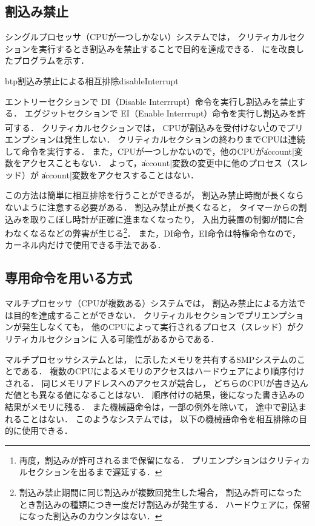 \subsection{割込み禁止}
\label{disableInterrupt}
シングルプロセッサ（CPUが一つしかない）システムでは，
クリティカルセクションを実行するとき割込みを禁止することで目的を達成できる．
にを改良したプログラムを示す．

\begin{myfig}{btp}{割込み禁止による相互排除}{disableInterrupt}
  
\end{myfig}

エントリーセクションで
DI（Disable Interrrupt）命令を実行し割込みを禁止する．
エグジットセクションで
EI（Enable Interrrupt）命令を実行し割込みを許可する．
クリティカルセクションでは，
CPUが割込みを受付けない\footnote{
  再度，割込みが許可されるまで保留になる．
  プリエンプションはクリティカルセクションを出るまで遅延する．
}のでプリエンプションは発生しない．
クリティカルセクションの終わりまでCPUは連続して命令を実行する．
また，CPUが一つしかないので，他のCPUが\|account|変数をアクセスこともない．
よって，\|account|変数の変更中に他のプロセス（スレッド）が
\|account|変数をアクセスすることはない．

この方法は簡単に相互排除を行うことができるが，
割込み禁止時間が長くならないように注意する必要がある．
割込み禁止が長くなると，
タイマーからの割込みを取りこぼし時計が正確に進まなくなったり，
入出力装置の制御が間に合わなくなるなどの弊害が生じる\footnote{
  割込み禁止期間に同じ割込みが複数回発生した場合，
  割込み許可になったとき割込みの種類につき一度だけ割込みが発生する．
  ハードウェアに，保留になった割込みのカウンタはない．}．
また，DI命令，EI命令は特権命令なので，
カーネル内だけで使用できる手法である．

\subsection{専用命令を用いる方式}
マルチプロセッサ（CPUが複数ある）システムでは，
割込み禁止による方法では目的を達成することができない．
クリティカルセクションでプリエンプションが発生しなくても，
他のCPUによって実行されるプロセス（スレッド）がクリティカルセクションに
入る可能性があるからである．

マルチプロセッサシステムとは，
に示したメモリを共有するSMPシステムのことである．
複数のCPUによるメモリのアクセスはハードウェアにより順序付けされる．
同じメモリアドレスへのアクセスが競合し，
どちらのCPUが書き込んだ値とも異なる値になることはない．
順序付けの結果，後になった書き込みの結果がメモリに残る．
また機械語命令は，一部の例外を除いて，
途中で割込まれることはない．
このようなシステムでは，
以下の機械語命令を相互排除の目的に使用できる．

